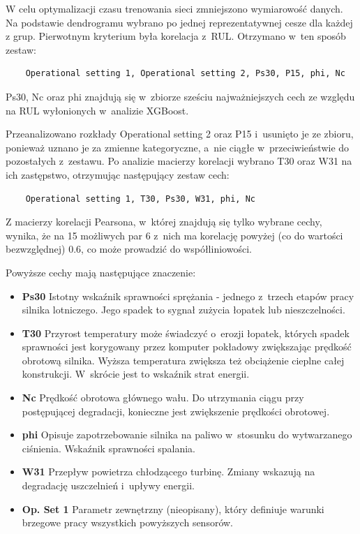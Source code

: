 W celu optymalizacji czasu trenowania sieci zmniejszono wymiarowość danych. Na podstawie dendrogramu wybrano po jednej reprezentatywnej cesze dla każdej z grup. Pierwotnym kryterium była korelacja z~RUL. Otrzymano w~ten sposób zestaw:
\begin{verbatim}
    Operational setting 1, Operational setting 2, Ps30, P15, phi, Nc
\end{verbatim}

Ps30, Nc oraz phi znajdują się w~zbiorze sześciu najważniejszych cech ze względu na RUL wyłonionych w~analizie XGBoost.

Przeanalizowano rozkłady Operational setting 2 oraz P15 i~usunięto je ze zbioru, ponieważ uznano je za zmienne kategoryczne, a~nie ciągłe w~przeciwieństwie do pozostałych z~zestawu. Po analizie macierzy korelacji wybrano T30 oraz W31 na ich zastępstwo, otrzymując następujący zestaw cech:
\begin{verbatim}
    Operational setting 1, T30, Ps30, W31, phi, Nc
\end{verbatim}

Z macierzy korelacji Pearsona, w~której znajdują się tylko wybrane cechy, wynika, że na 15 możliwych par 6 z~nich ma korelację powyżej (co do wartości bezwzględnej) 0.6, co może prowadzić do współliniowości.

Powyższe cechy mają następujące znaczenie:
\begin{itemize}
    \item \textbf{Ps30} Istotny wskaźnik sprawności sprężania - jednego z~trzech etapów pracy silnika lotniczego. Jego spadek to sygnał zużycia łopatek lub nieszczelności.
    \item \textbf{T30} Przyrost temperatury może świadczyć o~erozji łopatek, których spadek sprawności jest korygowany przez komputer pokładowy zwiększając prędkość obrotową silnika. Wyższa temperatura zwiększa też obciążenie cieplne całej konstrukcji. W~skrócie jest to wskaźnik strat energii.
    \item \textbf{Nc} Prędkość obrotowa głównego wału. Do utrzymania ciągu przy postępującej degradacji, konieczne jest zwiększenie prędkości obrotowej.
    \item \textbf{phi} Opisuje zapotrzebowanie silnika na paliwo w~stosunku do wytwarzanego ciśnienia. Wskaźnik sprawności spalania.
    \item \textbf{W31} Przepływ powietrza chłodzącego turbinę. Zmiany wskazują na degradację uszczelnień i~upływy energii.
    \item \textbf{Op. Set 1} Parametr zewnętrzny (nieopisany), który definiuje warunki brzegowe pracy wszystkich powyższych sensorów.
\end{itemize}


